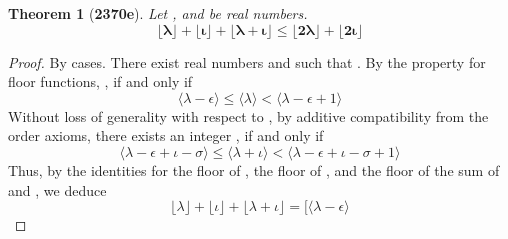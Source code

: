 \documentclass[preview]{standalone}
\newtheorem{theorem}{Theorem}
\begin{document}
\begin{theorem}[\textbf{2370e}]
    Let \bm{$\lambda$}, and \bm{$\iota$} be real numbers.
    \begin{equation*}
        \bm{
            \big \lfloor \lambda \big \rfloor 
                + 
            \big \lfloor \iota \big \rfloor  
                + 
            \big \lfloor \lambda + \iota \big \rfloor 
                \le 
            \big \lfloor 2 \lambda \big \rfloor 
                + 
            \big \lfloor 2 \iota \big \rfloor
        }
    \end{equation*}
\end{theorem}

\begin{proof}
    By cases.
    There exist real numbers \bm{$\epsilon$} and \bm{$\sigma$} such that
    \bm{$\lambda - \lfloor \lambda \rfloor = \epsilon$}. 
    By the property for floor functions,
    \bm{$\lfloor \lambda \rfloor = \lambda - \epsilon$},
    if and only if
    \begin{equation*}
        \Big \langle \lambda - \epsilon \Big \rangle
            \leq 
        \Big \langle \lambda \Big \rangle
            < 
        \Big \langle \lambda - \epsilon + 1 \Big \rangle
    \end{equation*}
    Without loss of generality with respect to \bm{$\iota$}, 
    by additive compatibility from the order axioms,
    there exists an integer 
    \bm{$
        \lfloor \lambda + \iota \rfloor 
            = 
        \big \langle \lambda - \epsilon \big \rangle
            +
        \big \langle \iota - \sigma \big \rangle$},
    if and only if
    \begin{equation*}
        \Big \langle
            \lambda - \epsilon
                + 
            \iota - \sigma
        \Big \rangle
            \leq 
        \Big \langle \lambda + \iota \Big \rangle
            < 
        \Big \langle
            \lambda - \epsilon
                + 
            \iota - \sigma
                + 
            1
        \Big \rangle
    \end{equation*}
    Thus, by the identities for the floor of \bm{$\lambda$},
    the floor of \bm{$\iota$}, 
    and the floor of the sum of \bm{$\lambda$} and \bm{$\iota$},
    we deduce 
    \begin{equation*}
        \big \lfloor \lambda \big \rfloor
            +
        \big \lfloor \iota \big \rfloor
            +
        \big \lfloor \lambda + \iota \big \rfloor
            =
        \Big[
            \big \langle \lambda - \epsilon \big \rangle

\end{equation*}
\end{proof}
\end{document}
